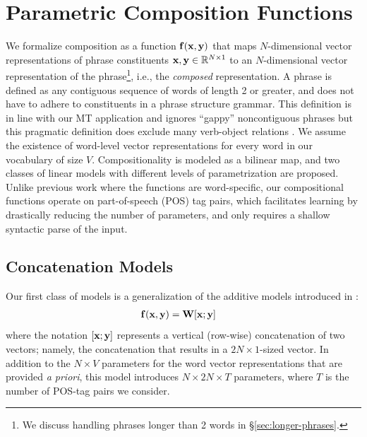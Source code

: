 \documentclass[11pt]{article}
\newcommand{\bX}{{\bf x}}
\newcommand{\bY}{{\bf y}}
\newcommand{\bF}{{\bf f}}
\newcommand{\bW}{{\bf W}}
\begin{document}
\section{Parametric Composition Functions}
\label{sec:learning}

We formalize composition as a function $\bF (\bX, \bY)$ that maps $N$-dimensional vector representations of phrase constituents $\bX, \bY \in \mathbb{R}^{N \times 1}$  to an $N$-dimensional vector representation of the phrase\footnote{We discuss handling phrases longer than 2 words in \S\ref{sec:longer-phrases}.}, i.e., the \emph{composed} representation. 
A phrase is defined as any contiguous sequence of words of length 2 or greater, and does not have to adhere to constituents in a phrase structure grammar. 
This definition is in line with our MT application and ignores ``gappy'' noncontiguous phrases but this pragmatic definition does exclude many verb-object relations \cite{Koehn2003}.  
We assume the existence of word-level vector representations for every word in our vocabulary of size $V$.
Compositionality is modeled as a bilinear map, and two classes of linear models with different levels of parametrization are proposed.  
Unlike previous work \cite[\emph{inter alia}]{Baroni2010,Socher2013,Grefenstette2013} where the functions are  word-specific, our compositional functions operate on part-of-speech (POS) tag pairs, which facilitates learning by drastically reducing the number of parameters, and only requires a shallow syntactic parse of the input. 

\subsection{Concatenation Models}
\label{sec:concat}

Our first class of models is a generalization of the additive models introduced in :
\begin{align}
	\bF (\bX, \bY) &= \bW [\bX;\bY]
	\label{eq:concat}
\end{align}
where the notation $[\bX; \bY]$ represents a vertical (row-wise) concatenation of two vectors; namely, the concatenation that results in a $2N \times 1$-sized vector.  
In addition to the $N \times V$ parameters for the word vector representations that are provided \emph{a priori}, this model introduces $N \times 2N \times T$ parameters, where $T$ is the number of POS-tag pairs we consider.  
\end{document}
